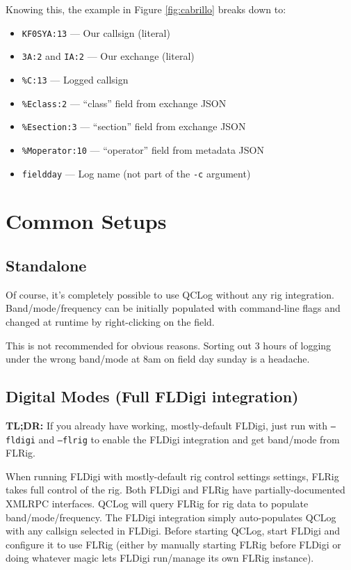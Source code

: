 \documentclass[a4paper,10pt]{article}
\begin{document}
Knowing this, the example in Figure \ref{fig:cabrillo} breaks down to:
\begin{itemize}
 \item \texttt{KF0SYA:13} --- Our callsign (literal)
 \item \texttt{3A:2} and \texttt{IA:2} --- Our exchange (literal)
 \item \texttt{\%C:13} --- Logged callsign
 \item \texttt{\%Eclass:2} --- ``class'' field from exchange JSON
 \item \texttt{\%Esection:3} --- ``section'' field from exchange JSON
 \item \texttt{\%Moperator:10} --- ``operator'' field from metadata JSON
 \item \texttt{fieldday} --- Log name (not part of the \texttt{-c} argument)
\end{itemize}

\section{Common Setups}
\subsection{Standalone}
Of course, it's completely possible to use QCLog without any rig integration.
Band/mode/frequency can be initially populated with command-line flags and changed
at runtime by right-clicking on the field.

This is not recommended for obvious reasons. Sorting out 3 hours of logging
under the wrong band/mode at 8am on field day sunday is a headache.

\subsection{Digital Modes (Full FLDigi integration)}
\textbf{TL;DR:} If you already have working, mostly-default FLDigi, just run with \texttt{--fldigi} 
and \texttt{--flrig} to enable the FLDigi integration and get band/mode from FLRig. 

When running FLDigi with mostly-default rig control settings
settings, FLRig takes full control of the rig. Both FLDigi and FLRig have
partially-documented XMLRPC interfaces. QCLog
will query FLRig for rig data to populate band/mode/frequency. The FLDigi integration
simply auto-populates QCLog with any callsign selected in FLDigi. Before starting QCLog,
start FLDigi and configure it to use FLRig (either by manually starting FLRig before
FLDigi or doing whatever magic lets FLDigi run/manage its own FLRig instance).
\end{document}

